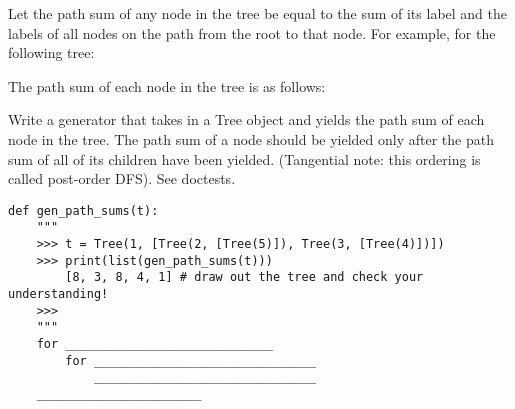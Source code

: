 \begin{blocksection}
\question Let the path sum of any node in the tree be equal to the sum of its label and the labels of all nodes on the path from the root to that node. For example, for the following tree:

The path sum of each node in the tree is as follows:


Write a generator that takes in a Tree object and yields the path sum of each node in the tree. The path sum of a node should be yielded only after the path sum of all of its children have been yielded. (Tangential note: this ordering is called post-order DFS). See doctests.


\begin{lstlisting}
def gen_path_sums(t):
    """
    >>> t = Tree(1, [Tree(2, [Tree(5)]), Tree(3, [Tree(4)])])
    >>> print(list(gen_path_sums(t)))
       	[8, 3, 8, 4, 1] # draw out the tree and check your understanding!
    >>> 
    """    
    for _____________________________
    	for _______________________________
    		_______________________________
    _______________________
\end{lstlisting}
\end{blocksection}

